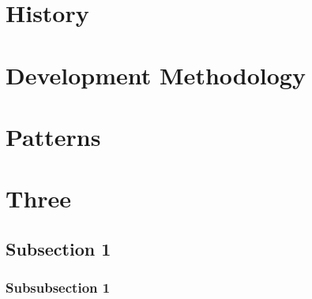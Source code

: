 \documentclass[12pt]{article} %
\begin{document}
\lipsum[4] %


\section{History} %




\section{Development Methodology} %








\section{Patterns} %



\section{Three}
\subsection{Subsection 1} %

\subsubsection{Subsubsection 1} %

\lipsum[6] %
\end{document}

